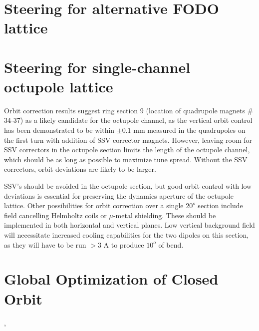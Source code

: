 \section{Steering for alternative FODO lattice}


\section{Steering for single-channel octupole lattice}

Orbit correction results suggest ring section 9 (location of quadrupole magnets \# 34-37) as a likely candidate for the octupole channel, as the vertical orbit control has been demonstrated to be within $\pm 0.1$ mm measured in the quadrupoles on the first turn with addition of SSV corrector magnets. However, leaving room for SSV correctors in the octupole section limits the length of the octupole channel, which should be as long as possible to maximize tune spread. Without the SSV correctors, orbit deviations are likely to be larger. 

SSV's should be avoided in the octupole section, but good orbit control with low deviations is essential for preserving the dynamics aperture of the octupole lattice. Other possibilities for orbit correction over a single $20^o$ section include field cancelling Helmholtz coils or $\mu$-metal shielding. These should be implemented in both horizontal and vertical planes. Low vertical background field will necessitate increased cooling capabilities for the two dipoles on this section, as they will have to be run $>3$ A to produce $10^o$ of bend. 




\section{Global Optimization of Closed Orbit}
\cite{Kirkpatrick2015} %
\cite{Huang2013}, \cite{LevonRCDS} %

